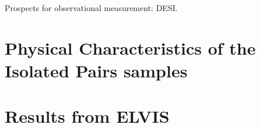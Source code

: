 \documentclass[a4paper,fleqn,usenatbib]{mnras}
\begin{document}
Prospects for observational measurement: DESI.






\newpage
\appendix

\section{Physical Characteristics of the Isolated Pairs samples}

\section{Results from ELVIS}
\end{document}
